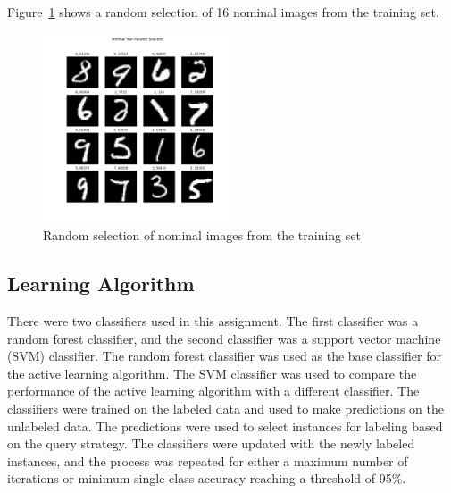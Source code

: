Figure~\ref{fig:nominal_train} shows a random selection of 16 nominal images from the training set.
\begin{figure}[htbp]
    \centering
    \includegraphics[width=0.5\textwidth]{resources/images/_nominal_train_random_selection.png}
    \caption{Random selection of nominal images from the training set}
    \label{fig:nominal_train}
    \end{figure}
\subsection{Learning Algorithm}
There were two classifiers used in this assignment. The first classifier was a random forest classifier, and the second classifier was a support vector machine (SVM) classifier.
The random forest classifier was used as the base classifier for the active learning algorithm. The SVM classifier was used to compare the performance of the active learning algorithm with a different classifier. 
The classifiers were trained on the labeled data and used to make predictions on the unlabeled data. The predictions were used to select instances for labeling based on the query strategy. 
The classifiers were updated with the newly labeled instances, and the process was repeated for either a maximum number of iterations or minimum single-class accuracy reaching a threshold of 95\%.


